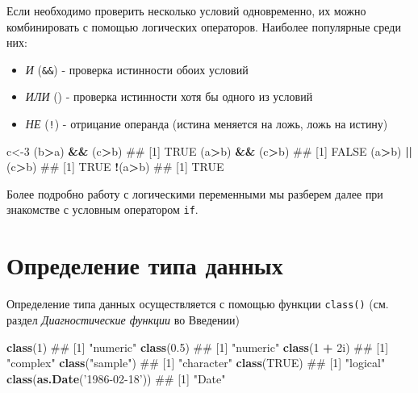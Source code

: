 \documentclass[]{book}
\newenvironment{Shaded}{\begin{snugshade}}{\end{snugshade}}
\newcommand{\KeywordTok}[1]{\textcolor[rgb]{0.13,0.29,0.53}{\textbf{#1}}}
\newcommand{\DecValTok}[1]{\textcolor[rgb]{0.00,0.00,0.81}{#1}}
\newcommand{\FloatTok}[1]{\textcolor[rgb]{0.00,0.00,0.81}{#1}}
\newcommand{\StringTok}[1]{\textcolor[rgb]{0.31,0.60,0.02}{#1}}
\newcommand{\OtherTok}[1]{\textcolor[rgb]{0.56,0.35,0.01}{#1}}
\newcommand{\OperatorTok}[1]{\textcolor[rgb]{0.81,0.36,0.00}{\textbf{#1}}}
\newcommand{\NormalTok}[1]{#1}
\providecommand{\tightlist}{%
  \setlength{\itemsep}{0pt}\setlength{\parskip}{0pt}}
\begin{document}
Если необходимо проверить несколько условий одновременно, их можно
комбинировать с помощью логических операторов. Наиболее популярные среди
них:

\begin{itemize}
\tightlist
\item
  \emph{И} (\texttt{\&\&}) - проверка истинности обоих условий
\item
  \emph{ИЛИ} (\texttt{\textbar{}\textbar{}}) - проверка истинности хотя
  бы одного из условий
\item
  \emph{НЕ} (\texttt{!}) - отрицание операнда (истина меняется на ложь,
  ложь на истину)
\end{itemize}

\begin{Shaded}
\begin{Highlighting}[]
\NormalTok{c<-}\DecValTok{3}
\NormalTok{(b}\OperatorTok{>}\NormalTok{a) }\OperatorTok{&&}\StringTok{ }\NormalTok{(c}\OperatorTok{>}\NormalTok{b)}
\NormalTok{## [1] TRUE}
\NormalTok{(a}\OperatorTok{>}\NormalTok{b) }\OperatorTok{&&}\StringTok{ }\NormalTok{(c}\OperatorTok{>}\NormalTok{b)}
\NormalTok{## [1] FALSE}
\NormalTok{(a}\OperatorTok{>}\NormalTok{b) }\OperatorTok{||}\StringTok{ }\NormalTok{(c}\OperatorTok{>}\NormalTok{b)}
\NormalTok{## [1] TRUE}
\OperatorTok{!}\NormalTok{(a}\OperatorTok{>}\NormalTok{b)}
\NormalTok{## [1] TRUE}
\end{Highlighting}
\end{Shaded}

Более подробно работу с логическими переменными мы разберем далее при
знакомстве с условным оператором \texttt{if}.

\section{Определение типа данных}\label{determine_data_type}

Определение типа данных осуществляется с помощью функции
\texttt{class()} (см. раздел \emph{Диагностические функции} во Введении)

\begin{Shaded}
\begin{Highlighting}[]
\KeywordTok{class}\NormalTok{(}\DecValTok{1}\NormalTok{)}
\NormalTok{## [1] "numeric"}
\KeywordTok{class}\NormalTok{(}\FloatTok{0.5}\NormalTok{)}
\NormalTok{## [1] "numeric"}
\KeywordTok{class}\NormalTok{(}\DecValTok{1} \OperatorTok{+}\StringTok{ }\NormalTok{2i)}
\NormalTok{## [1] "complex"}
\KeywordTok{class}\NormalTok{(}\StringTok{"sample"}\NormalTok{)}
\NormalTok{## [1] "character"}
\KeywordTok{class}\NormalTok{(}\OtherTok{TRUE}\NormalTok{)}
\NormalTok{## [1] "logical"}
\KeywordTok{class}\NormalTok{(}\KeywordTok{as.Date}\NormalTok{(}\StringTok{'1986-02-18'}\NormalTok{))}
\NormalTok{## [1] "Date"}
\end{Highlighting}
\end{Shaded}
\end{document}
